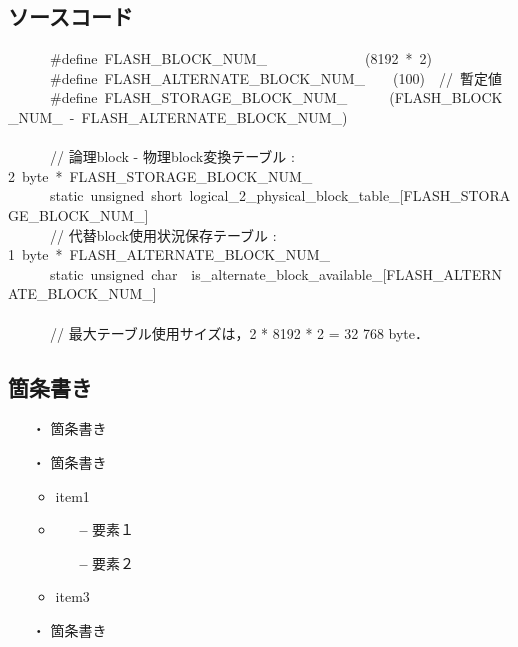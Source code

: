 \documentclass[10pt,a4paper]{ltjsarticle}			%
\newcommand{\mySubsection}[1] {
	\subsection{#1}
	\vspace{-5pt}
}
\begin{document}
\mySubsection{ソースコード}
\begin{spacing}{0.8}
\begin{footnotesize}
\begin{ttfamily}
\begin{fontConsolas}
\noindent
~~~~~~\#define~FLASH\_BLOCK\_NUM\_~~~~~~~~~~~~~~(8192~*~2)\\
~~~~~~\#define~FLASH\_ALTERNATE\_BLOCK\_NUM\_~~~~(100)~~//~暫定値\\
~~~~~~\#define~FLASH\_STORAGE\_BLOCK\_NUM\_~~~~~~(FLASH\_BLOCK\_NUM\_~-~FLASH\_ALTERNATE\_BLOCK\_NUM\_)\\
~~~~~~\\
~~~~~~// 論理block - 物理block変換テーブル : 2~byte~*~FLASH\_STORAGE\_BLOCK\_NUM\_\\
~~~~~~static~unsigned~short~logical\_2\_physical\_block\_table\_[FLASH\_STORAGE\_BLOCK\_NUM\_]\\
~~~~~~// 代替block使用状況保存テーブル : 1~byte~*~FLASH\_ALTERNATE\_BLOCK\_NUM\_\\
~~~~~~static~unsigned~char~~is\_alternate\_block\_available\_[FLASH\_ALTERNATE\_BLOCK\_NUM\_]\\
~~~~~~\\
~~~~~~// 最大テーブル使用サイズは，2 * 8192 * 2 = 32 768 byte．
\end{fontConsolas}
\end{ttfamily}
\end{footnotesize}
\end{spacing}

\mySubsection{箇条書き}
\begin{itemize}
	\setlength{\leftskip}{-15pt}
	\item[・] 箇条書き
	\item[・] 箇条書き
	\begin{itemize}
		\setlength{\leftskip}{-10pt}
		\item item1
		\item {}
		\begin{itemize}
			\setlength{\leftskip}{-5pt}
			\item[{\normalfont\bfseries --}] 要素１
			\item[{\normalfont\bfseries --}] 要素２
		\end{itemize}
		\item item3
	\end{itemize}
	\item[・] 箇条書き
\end{itemize}
\end{document}
